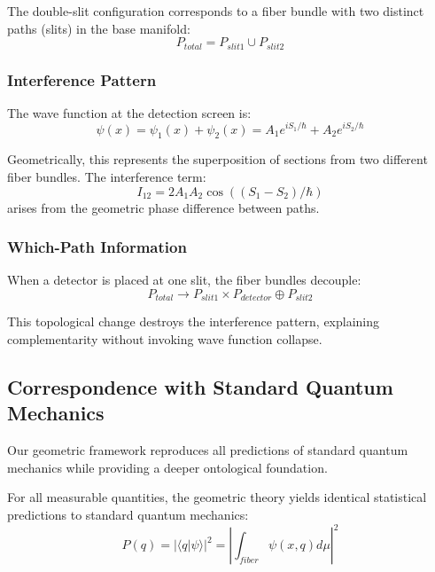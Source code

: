 The double-slit configuration corresponds to a fiber bundle with two distinct paths (slits) in the base manifold:
\begin{equation}
    P_{total} = P_{slit1} \cup P_{slit2}
\end{equation}

\subsubsection{Interference Pattern}

The wave function at the detection screen is:
\begin{equation}
    \psi(x) = \psi_1(x) + \psi_2(x) = A_1 e^{iS_1/\hbar} + A_2 e^{iS_2/\hbar}
\end{equation}

Geometrically, this represents the superposition of sections from two different fiber bundles. The interference term:
\begin{equation}
    I_{12} = 2A_1 A_2 \cos((S_1 - S_2)/\hbar)
\end{equation}
arises from the geometric phase difference between paths.

\subsubsection{Which-Path Information}

When a detector is placed at one slit, the fiber bundles decouple:
\begin{equation}
    P_{total} \to P_{slit1} \times P_{detector} \oplus P_{slit2}
\end{equation}

This topological change destroys the interference pattern, explaining complementarity without invoking wave function collapse.

\subsection{Correspondence with Standard Quantum Mechanics}

Our geometric framework reproduces all predictions of standard quantum mechanics while providing a deeper ontological foundation.

\begin{proposition}
For all measurable quantities, the geometric theory yields identical statistical predictions to standard quantum mechanics:
\begin{equation}
    P(q) = |\langle q|\psi\rangle|^2 = \left|\int_{fiber} \psi(x,q) d\mu\right|^2
\end{equation}
\end{proposition}

